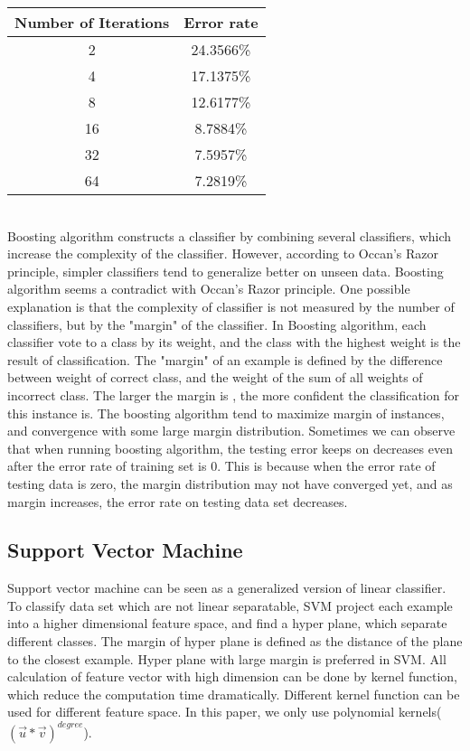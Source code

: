 \documentclass[a4paper,11pt]{article}
\begin{document}
\vspace{0.5cm}
\begin{tabular}{c c}
Number of Iterations	& Error rate\\
\hline \hline
	2		& 24.3566\%\\
	4		& 17.1375\%\\
	8		& 12.6177\%\\
	16		& 8.7884\%\\
	32		& 7.5957\%\\
	64		& 7.2819\%\\
\end{tabular}
\vspace{0.5cm}\\
Boosting algorithm constructs a classifier by combining several classifiers, which increase the complexity of the classifier. However, according to Occan's Razor principle, simpler classifiers tend to generalize better on unseen data. Boosting algorithm seems a contradict with Occan's Razor principle.
One possible explanation is that the complexity of classifier is not measured by the number of classifiers, but by the "margin" of the classifier.
In Boosting algorithm, each classifier vote to a class by its weight, and the class with the highest weight is the result of classification. The "margin" of an example is defined by the difference between weight of correct class, and the weight of the sum of all weights of incorrect class. The larger the margin is , the more confident the classification for this instance is. The boosting algorithm tend to maximize margin of instances, and convergence with some large margin distribution. Sometimes we can observe that when running boosting algorithm, the testing error keeps on decreases even after the error rate of training set is 0. This is because when the error rate of testing data is zero, the margin distribution may not have converged yet, and as margin increases, the error rate on testing data set decreases.
\subsection{Support Vector Machine}
Support vector machine can be seen as a generalized version of linear classifier. To classify data set which are not linear separatable, SVM project each example into a higher dimensional feature space, and find a hyper plane, which separate different classes. The margin of hyper plane is defined as the distance of the plane to the closest example. Hyper plane with large margin is preferred in SVM. All calculation of feature vector with high dimension can be done by kernel function, which reduce the computation time dramatically. Different kernel function can be used for different feature space. In this paper, we only use polynomial kernels($(\vec{u}*\vec{v})^{degree}$).
\end{document}
